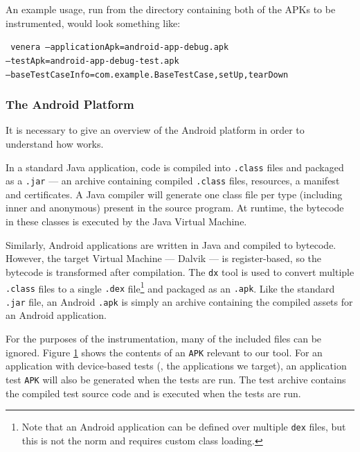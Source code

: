 An example usage, run from the directory containing both of the APKs to be
instrumented, would look something like:

\texttt{
  venera --applicationApk=android-app-debug.apk\\
  --testApk=android-app-debug-test.apk\\
  --baseTestCaseInfo=com.example.BaseTestCase,setUp,tearDown
}

\subsubsection{The Android Platform}

It is necessary to give an overview of the Android platform in order to
understand how \venera works.

In a standard Java application, code is compiled into {\tt .class} files and
packaged as a {\tt .jar} --- an archive containing compiled {\tt .class} files,
resources, a manifest and certificates. A Java compiler will generate one class
file per type (including inner and anonymous) present in the source program. At
runtime, the bytecode in these classes is executed by the Java Virtual Machine.

Similarly, Android applications are written in Java and compiled to bytecode.
However, the target Virtual Machine --- Dalvik --- is register-based, so the
bytecode is transformed after compilation. The {\tt dx} tool is used to convert
multiple {\tt .class} files to a single {\tt .dex} file\footnote{Note that an
Android application can be defined over multiple {\tt dex} files, but this is
not the norm and requires custom class loading.} and packaged as an {\tt .apk}.
Like the standard {\tt .jar} file, an Android {\tt .apk} is simply an archive
containing the compiled assets for an Android application.

For the purposes of the instrumentation, many of the included files can be
ignored. Figure \ref{fig:android_apk} shows the contents of an {\tt APK}
relevant to our tool. For an application with device-based tests (\ie, the
applications we target), an application test {\tt APK} will also be generated
when the tests are run. The test archive contains the compiled test source code
and is executed when the tests are run.

\begin{figure}[h]
\caption{}
\label{fig:android_apk}
\end{figure}

